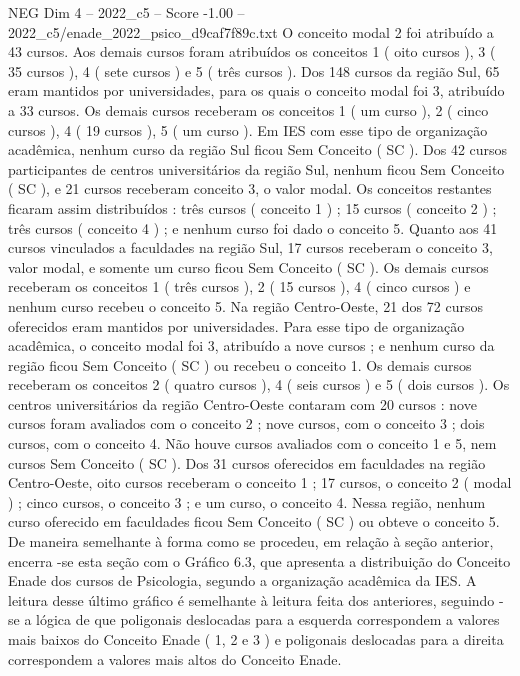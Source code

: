 \begin{textsample}{NEG Dim 4 – 2022\_c5 – Score -1.00 – 2022\_c5/enade\_2022\_psico\_d9caf7f89c.txt}
O conceito modal 2 foi atribuído a 43 cursos.
Aos demais cursos foram atribuídos os conceitos 1 ( oito cursos ), 3 ( 35 cursos ), 4 ( sete cursos ) e 5 ( três cursos ).
Dos 148 cursos da região Sul, 65 eram mantidos por universidades, para os quais o conceito modal foi 3, atribuído a 33 cursos.
Os demais cursos receberam os conceitos 1 ( um curso ), 2 ( cinco cursos ), 4 ( 19 cursos ), 5 ( um curso ).
Em IES com esse tipo de organização acadêmica, nenhum curso da região Sul ficou Sem Conceito ( SC ).
Dos 42 cursos participantes de centros universitários da região Sul, nenhum ficou Sem Conceito ( SC ), e 21 cursos receberam conceito 3, o valor modal.
Os conceitos restantes ficaram assim distribuídos : três cursos ( conceito 1 ) ; 15 cursos ( conceito 2 ) ; três cursos ( conceito 4 ) ; e nenhum curso foi dado o conceito 5.
Quanto aos 41 cursos vinculados a faculdades na região Sul, 17 cursos receberam o conceito 3, valor modal, e somente um curso ficou Sem Conceito ( SC ).
Os demais cursos receberam os conceitos 1 ( três cursos ), 2 ( 15 cursos ), 4 ( cinco cursos ) e nenhum curso recebeu o conceito 5.
Na região Centro-Oeste, 21 dos 72 cursos oferecidos eram mantidos por universidades.
Para esse tipo de organização acadêmica, o conceito modal foi 3, atribuído a nove cursos ; e nenhum curso da região ficou Sem Conceito ( SC ) ou recebeu o conceito 1.
Os demais cursos receberam os conceitos 2 ( quatro cursos ), 4 ( seis cursos ) e 5 ( dois cursos ).
Os centros universitários da região Centro-Oeste contaram com 20 cursos : nove cursos foram avaliados com o conceito 2 ; nove cursos, com o conceito 3 ; dois cursos, com o conceito 4.
Não houve cursos avaliados com o conceito 1 e 5, nem cursos Sem Conceito ( SC ).
Dos 31 cursos oferecidos em faculdades na região Centro-Oeste, oito cursos receberam o conceito 1 ; 17 cursos, o conceito 2 ( modal ) ; cinco cursos, o conceito 3 ; e um curso, o conceito 4.
Nessa região, nenhum curso oferecido em faculdades ficou Sem Conceito ( SC ) ou obteve o conceito 5.
De maneira semelhante à forma como se procedeu, em relação à seção anterior, encerra -se esta seção com o Gráfico 6.3, que apresenta a distribuição do Conceito Enade dos cursos de Psicologia, segundo a organização acadêmica da IES.
A leitura desse último gráfico é semelhante à leitura feita dos anteriores, seguindo -se a lógica de que poligonais deslocadas para a esquerda correspondem a valores mais baixos do Conceito Enade ( 1, 2 e 3 ) e poligonais deslocadas para a direita correspondem a valores mais altos do Conceito Enade.

\end{textsample}
